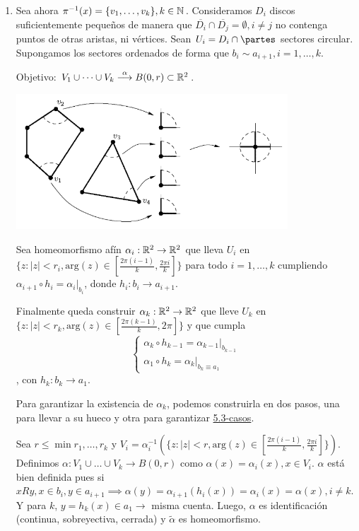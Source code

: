 {\begin{enumerate}
        \item Sea ahora $\pi^{-1}(x) = \{v_1, \dots, v_k\}, k \in \mathbb{N}$. Consideramos $D_i$ discos suficientemente pequeños de manera que $\overline{D_i} \cap \overline{D_j} = \emptyset, i \neq j$ no contenga puntos de otras aristas, ni vértices. 
        Sean $U_i = D_i \cap \partes$ sectores circular. Supongamos los sectores ordenados de forma que $b_i \sim a_{i+1}, i=1,\dots,k$.

        Objetivo: $V_1 \cup \dots \cup V_k \overset{\alpha}{\longrightarrow} B(0,r) \subset \mathbb{R}^2$. 
        
        \begin{center}
            \includegraphics[width=0.8\textwidth]{img/entornos-vertices.png}
        \end{center}

        Sea homeomorfismo afín $\alpha_i : \mathbb{R}^2 \to \mathbb{R}^2$ que lleva $U_i$ en $\{z : |z| < r_i, \text{arg}(z) \in [\frac{2\pi(i-1)}{k}, \frac{2\pi i}{k}]\}$ para todo $i=1,\dots,k$ cumpliendo $\alpha_{i+1} \circ h_i = \alpha_i|_{b_i}$, donde $h_i : b_i \to a_{i+1}$.
        
        Finalmente queda construir $\alpha_k : \mathbb{R}^2 \to \mathbb{R}^2$ que lleve $U_k$ en $\{z : |z| < r_k, \text{arg}(z) \in [\frac{2\pi(k-1)}{k}, 2\pi]\}$ y que cumpla 
        \begin{equation}
            \label{5.3-casos} \begin{cases}
                \alpha_k \circ h_{k-1} = \alpha_{k-1}|_{b_{k-1}} \\
                \alpha_1 \circ h_k = \alpha_k|_{b_k \equiv a_1}
            \end{cases}
        \end{equation}, con $h_k : b_k \to a_1$.
        
        Para garantizar la existencia de $\alpha_k$, podemos construirla en dos pasos, una para llevar a su hueco y otra para garantizar \hyperref[5.3-casos]{5.3-casos}. 

        Sea $r \le \min{r_1, \dots, r_k}$ y $V_i = \alpha_i^{-1}(\{z : |z| < r, \text{arg}(z) \in [\frac{2\pi(i-1)}{k}, \frac{2\pi i}{k}]\})$. Definimos $\alpha : V_1 \cup \dots \cup V_k \to B(0,r)$ como $\alpha(x) = \alpha_i(x), x \in V_i$. $\alpha$ está bien definida pues si $xRy, x\in b_i, y \in a_{i+1} \implies \alpha(y) = \alpha_{i+1}(h_i(x)) = \alpha_i(x) = \alpha(x), i\ne k$. Y para $k$, $y = h_k(x) \in a_1 \to$ misma cuenta. Luego, $\alpha$ es identificación (continua, sobreyectiva, cerrada) y $\tilde{\alpha}$ es homeomorfismo.
    \end{enumerate}

}
